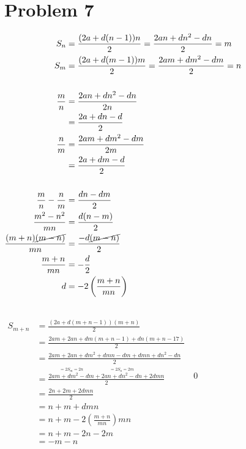 \documentclass{article}
\begin{document}
\section*{Problem 7}
\begin{minipage}[t]{0.4\linewidth}
$\begin{aligned}
	S_n&=\frac{(2a+d(n-1))n}{2}=\frac{2an+dn^2-dn}{2}=m \\
	S_m&=\frac{(2a+d(m-1))m}{2}=\frac{2am+dm^2-dm}{2}=n \\
	\\
	\frac{m}{n}&=\frac{2an+dn^2-dn}{2n} \\
	&=\frac{2a+dn-d}{2} \\
	\frac{n}{m}&=\frac{2am+dm^2-dm}{2m} \\
	&=\frac{2a+dm-d}{2} \\
	\\
	\frac{m}{n}-\frac{n}{m}&=\frac{dn-dm}{2} \\
	\frac{m^2-n^2}{mn}&=\frac{d(n-m)}{2} \\
	\frac{(m+n)\cancel{(m-n)}}{mn}&=\frac{-d\cancel{(m-n)}}{2} \\
	\frac{m+n}{mn}&=-\frac{d}{2} \\
	d&=-2\left(\frac{m+n}{mn}\right) \\
\end{aligned}$
\end{minipage}
\begin{minipage}[t]{0.4\linewidth}
$\begin{aligned}
	\\ \\ \\
	S_{m+n}&=\frac{(2a+d(m+n-1))(m+n)}{2} \\
	&=\frac{2am+2an+dm(m+n-1)+dn(m+n-17)}{2} \\
	&=\frac{2am+2an+dm^2+dmn-dm+dmn+dn^2-dn}{2} \\
	&=\frac{\stackrel{\displaystyle{=2S_m=2n}}{\boxed{2am+dm^2-dm}}+
		\stackrel{\displaystyle{=2S_n=2m}}{\boxed{2an+dn^2-dn}}+
		2dmn}{2} \\
	&=\frac{2n+2m+2dmn}{2} \\
	&=n+m+dmn \\
	&=n+m-2\left(\frac{m+n}{mn}\right)mn \\
	&=n+m-2n-2m \\
	&=-m-n
\end{aligned}$
\qed
\end{minipage}
\end{document}
